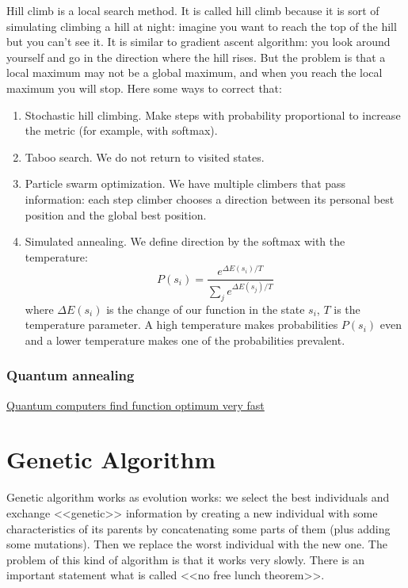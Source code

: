 Hill climb is a local search method. It is called hill climb because it is sort of simulating climbing a hill at night: imagine you want to reach the top of the hill but you can't see it. It is similar to gradient ascent algorithm: you look around yourself and go in the direction where the hill rises. But the problem is that a local maximum may not be a global maximum, and when you reach the local maximum you will stop. Here some ways to correct that:
\begin{enumerate}[label=$\bullet$]
	\item {\sc Stochastic hill climbing.} Make steps with probability proportional to increase the metric (for example, with softmax).
	\item {\sc Taboo search.} We do not return to visited states.
	\item {\sc Particle swarm optimization.} We have multiple climbers that pass information: each step climber chooses a direction between its personal best position and the global best position.
	\item {\sc Simulated annealing.} We define direction by the softmax with the temperature:
	$$P(s_i)=\frac{e^{\Delta E(s_i)/T}}{\sum\limits_{j} e^{\Delta E(s_j)/T}}$$
	where $\Delta E(s_i)$ is the change of our function in the state $s_i$, $T$ is the temperature parameter. A high temperature makes probabilities $P(s_i)$ even and a lower temperature makes one of the probabilities prevalent.
\end{enumerate}

\subsubsection*{Quantum annealing}

\href{https://docs.dwavesys.com/docs/latest/c_gs_2.html}{Quantum computers find function optimum very fast}

\section{Genetic Algorithm}

Genetic algorithm works as evolution works: we select the best individuals and exchange <<genetic>> information by creating a new individual with some characteristics of its parents by concatenating some parts of them (plus adding some mutations). Then we replace the worst individual with the new one. The problem of this kind of algorithm is that it works very slowly. There is an important statement what is called <<no free lunch theorem>>.


